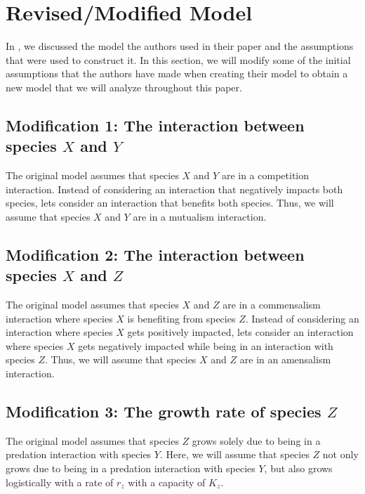 \section{Revised/Modified Model}\label{sec:modified_model}
In , we discussed the model the authors used in their paper and the assumptions that were used to construct it. In this section, we will modify some of the initial assumptions that the authors have made when creating their model to obtain a new model that we will analyze throughout this paper.

\subsection{Modification 1: The interaction between species $X$ and $Y$}\label{subsec:modification_1}
The original model assumes that species $X$ and $Y$ are in a competition interaction. Instead of considering an interaction that negatively impacts both species, lets consider an interaction that benefits both species. Thus, we will assume that species $X$ and $Y$ are in a mutualism interaction.

\subsection{Modification 2: The interaction between species $X$ and $Z$}\label{subsec:modification_2}
The original model assumes that species $X$ and $Z$ are in a commensalism interaction where species $X$ is benefiting from species $Z$. Instead of considering an interaction where species $X$ gets positively impacted, lets consider an interaction where species $X$ gets negatively impacted while being in an interaction with species $Z$. Thus, we will assume that species $X$ and $Z$ are in an amensalism interaction.

\subsection{Modification 3: The growth rate of species $Z$}\label{subsec:modification_3}
The original model assumes that species $Z$ grows solely due to being in a predation interaction with species $Y$. Here, we will assume that species $Z$ not only grows due to being in a predation interaction with species $Y$, but also grows logistically with a rate of $r_z$ with a capacity of $K_z$.

